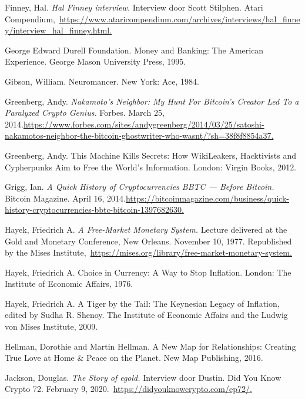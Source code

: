 \documentclass[smalldemyvopaper,11pt,twoside,onecolumn,openright,extrafontsizes,hidelinks]{memoir}
\begin{document}
Finney, Hal. \emph{Hal Finney interview.} Interview door Scott Stilphen.
Atari
Compendium,~\href{https://www.ataricompendium.com/archives/interviews/hal_finney/interview_hal_finney.html}{https://www.ataricompendium.com/archives/interviews/hal\_finney/interview\_hal\_finney.html.}

George Edward Durell Foundation. Money and Banking: The American
Experience. George Mason University Press, 1995.

Gibson, William. Neuromancer. New York: Ace, 1984.

Greenberg, Andy. \emph{Nakamoto's Neighbor: My Hunt For Bitcoin's
Creator Led To a Paralyzed Crypto Genius.} Forbes. March 25,
2014.\href{https://www.forbes.com/sites/andygreenberg/2014/03/25/satoshi-nakamotos-neighbor-the-bitcoin-ghostwriter-who-wasnt/?sh=38f8f8854a37}{https://www.forbes.com/sites/andygreenberg/2014/03/25/satoshi-nakamotos-neighbor-the-bitcoin-ghostwriter-who-wasnt/?sh=38f8f8854a37.}

Greenberg, Andy. This Machine Kills Secrets: How WikiLeakers,
Hacktivists and Cypherpunks Aim to Free the World's Information. London:
Virgin Books, 2012.

Grigg, Ian. \emph{A Quick History of Cryptocurrencies BBTC --- Before
Bitcoin.} Bitcoin Magazine. April 16,
2014.\href{https://bitcoinmagazine.com/business/quick-history-cryptocurrencies-bbtc-bitcoin-1397682630}{https://bitcoinmagazine.com/business/quick-history-cryptocurrencies-bbtc-bitcoin-1397682630.}

Hayek, Friedrich A. \emph{A Free-Market Monetary System.} Lecture
delivered at the Gold and Monetary Conference, New Orleans. November 10,
1977. Republished by the Mises
Institute,~\href{https://mises.org/library/free-market-monetary-system}{https://mises.org/library/free-market-monetary-system.}

Hayek, Friedrich A. Choice in Currency: A Way to Stop Inflation. London:
The Institute of Economic Affairs, 1976.

Hayek, Friedrich A. A Tiger by the Tail: The Keynesian Legacy of
Inflation, edited by Sudha R. Shenoy. The Institute of Economic Affairs
and the Ludwig von Mises Institute, 2009.

Hellman, Dorothie and Martin Hellman. A New Map for Relationships:
Creating True Love at Home \& Peace on the Planet. New Map Publishing,
2016.

Jackson, Douglas. \emph{The Story of egold.} Interview door Dustin. Did
You Know Crypto 72. February 9,
2020.~\href{https://didyouknowcrypto.com/ep72/}{https://didyouknowcrypto.com/ep72/.}
\end{document}
